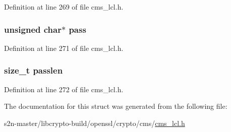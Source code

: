 Definition at line 269 of file cms\+\_\+lcl.\+h.

\subsubsection[{\texorpdfstring{pass}{pass}}]{\setlength{\rightskip}{0pt plus 5cm}unsigned char$\ast$ pass}\hypertarget{struct_c_m_s___password_recipient_info__st_a17d13e8afc00bfc1586fefbc7259b6b2}{}\label{struct_c_m_s___password_recipient_info__st_a17d13e8afc00bfc1586fefbc7259b6b2}


Definition at line 271 of file cms\+\_\+lcl.\+h.

\subsubsection[{\texorpdfstring{passlen}{passlen}}]{\setlength{\rightskip}{0pt plus 5cm}size\+\_\+t passlen}\hypertarget{struct_c_m_s___password_recipient_info__st_a7ee586ed031baaf4721dac696a3ad72b}{}\label{struct_c_m_s___password_recipient_info__st_a7ee586ed031baaf4721dac696a3ad72b}


Definition at line 272 of file cms\+\_\+lcl.\+h.



The documentation for this struct was generated from the following file\+:\begin{DoxyCompactItemize}
\item 
s2n-\/master/libcrypto-\/build/openssl/crypto/cms/\hyperlink{cms__lcl_8h}{cms\+\_\+lcl.\+h}\end{DoxyCompactItemize}
